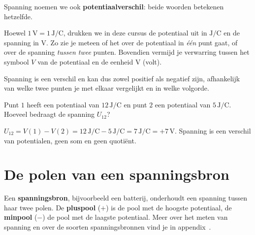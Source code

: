 \documentclass{ximera}
\begin{document}
Spanning noemen we ook \textbf{potentiaalverschil}: beide woorden betekenen hetzelfde.

\begin{remark}[expandable=true,title={Potentiaal in J/C, spanning in V}]\nl
Hoewel $1 \, \mathrm{V} = 1 \, \mathrm{J/C}$, drukken we in deze cursus de potentiaal uit in $\mathrm{J/C}$ en de spanning in $\mathrm{V}$. Zo zie je meteen of het over de potentiaal in \emph{één} punt gaat, of over de spanning \emph{tussen twee} punten. Bovendien vermijd je verwarring tussen het symbool $V$ van de potentiaal en de eenheid $\mathrm{V}$ (volt).
\end{remark}

\begin{remark}[expandable=true,title={Spanning is een verschil}]\nl
Spanning is een verschil en kan dus zowel positief als negatief zijn, afhankelijk van welke twee punten je met elkaar vergelijkt en in welke volgorde.
\end{remark}

\begin{question}
    Punt $1$ heeft een potentiaal van $12 \, \mathrm{J/C}$ en punt $2$ een potentiaal van $5 \, \mathrm{J/C}$. Hoeveel bedraagt de spanning $U_{12}$?

    \begin{multipleChoice}
    \end{multipleChoice}

    \begin{solution}\nl
        $U_{12} = V(1) - V(2) = 12 \, \mathrm{J/C} - 5 \, \mathrm{J/C} = 7 \, \mathrm{J/C} = +7 \, \mathrm{V}$. Spanning is een verschil van potentialen, geen som en geen quotiënt.
    \end{solution}
\end{question}

\section{De polen van een spanningsbron}
Een \textbf{spanningsbron}, bijvoorbeeld een batterij, onderhoudt een spanning tussen haar twee polen. De \textbf{pluspool} ($+$) is de pool met de hoogste potentiaal, de \textbf{minpool} ($-$) de pool met de laagste potentiaal. Meer over het meten van spanning en over de soorten spanningsbronnen vind je in appendix~.
\end{document}

